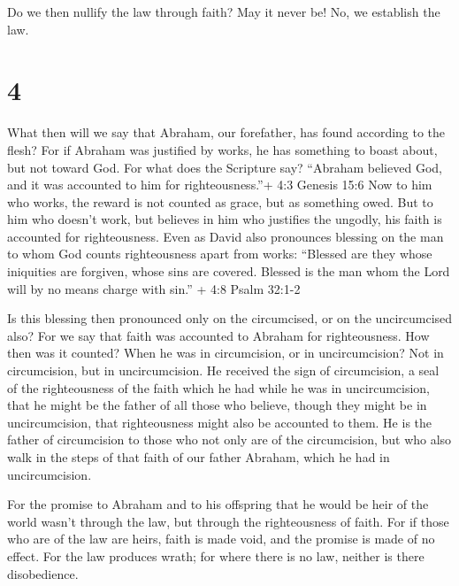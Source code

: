 Do we then nullify the law through faith? May it never be!
No, we establish the law.

\hypertarget{section-3}{%
\section{4}\label{section-3}}

 What then will we say that Abraham, our forefather, has
found according to the flesh?  For if Abraham was justified
by works, he has something to boast about, but not toward God.
 For what does the Scripture say? ``Abraham believed God,
and it was accounted to him for righteousness.''+ 4:3 Genesis 15:6
 Now to him who works, the reward is not counted as grace,
but as something owed.  But to him who doesn't work, but
believes in him who justifies the ungodly, his faith is accounted for
righteousness.  Even as David also pronounces blessing on
the man to whom God counts righteousness apart from works: 
``Blessed are they whose iniquities are forgiven, whose sins are
covered.  Blessed is the man whom the Lord will by no means
charge with sin.'' + 4:8 Psalm 32:1-2

 Is this blessing then pronounced only on the circumcised,
or on the uncircumcised also? For we say that faith was accounted to
Abraham for righteousness.  How then was it counted? When
he was in circumcision, or in uncircumcision? Not in circumcision, but
in uncircumcision.  He received the sign of circumcision, a
seal of the righteousness of the faith which he had while he was in
uncircumcision, that he might be the father of all those who believe,
though they might be in uncircumcision, that righteousness might also be
accounted to them.  He is the father of circumcision to
those who not only are of the circumcision, but who also walk in the
steps of that faith of our father Abraham, which he had in
uncircumcision.

 For the promise to Abraham and to his offspring that he
would be heir of the world wasn't through the law, but through the
righteousness of faith.  For if those who are of the law
are heirs, faith is made void, and the promise is made of no effect.
 For the law produces wrath; for where there is no law,
neither is there disobedience.

